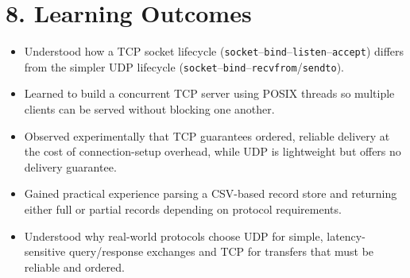 \documentclass[11pt]{article}
\begin{document}
\section*{8. Learning Outcomes}
\begin{itemize}
  \item Understood how a TCP socket lifecycle (\texttt{socket}--\texttt{bind}--\texttt{listen}--\texttt{accept}) differs from the simpler UDP lifecycle (\texttt{socket}--\texttt{bind}--\texttt{recvfrom}/\texttt{sendto}).
  \item Learned to build a concurrent TCP server using POSIX threads so multiple clients can be served without blocking one another.
  \item Observed experimentally that TCP guarantees ordered, reliable delivery at the cost of connection-setup overhead, while UDP is lightweight but offers no delivery guarantee.
  \item Gained practical experience parsing a CSV-based record store and returning either full or partial records depending on protocol requirements.
  \item Understood why real-world protocols choose UDP for simple, latency-sensitive query/response exchanges and TCP for transfers that must be reliable and ordered.
\end{itemize}
\end{document}

